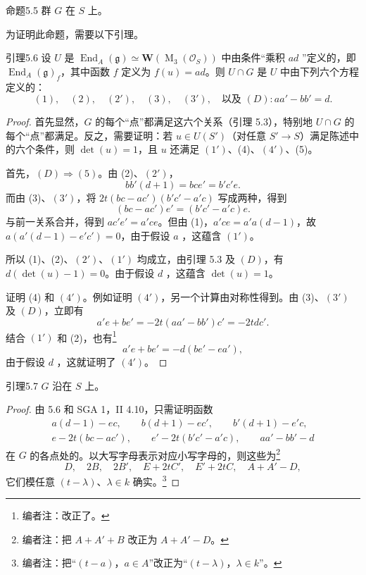 \begin{SGAresult}{命题}{5.5}
群 $G$ 在 $S$ 上。
\end{SGAresult}
为证明此命题，需要以下引理。
\begin{SGAresult}{引理}{5.6}
设 $U$ 是 $\operatorname{End}_A(\mathfrak g)\simeq\mathbf W(\operatorname M_3(\mathscr O_S))$ 中由条件“乘积 $ad$ ”定义的，即 $\operatorname{End}_A(\mathfrak g)_f$，其中函数 $f$ 定义为 $f(u)=ad$。则 $U\cap G$ 是 $U$ 中由下列六个方程定义的：
\[
(1),\quad(2),\quad(2'),\quad(3),\quad(3'),\quad\text{以及 }(D):aa'-bb'=d.
\]
\end{SGAresult}
\begin{proof}
首先显然，$G$ 的每个“点”都满足这六个关系（引理 5.3），特别地 $U\cap G$ 的每个“点”都满足。反之，需要证明：若 $u\in U(S')$（对任意 $S'\to S$）满足陈述中的六个条件，则 $\det(u)=1$，且 $u$ 还满足 $(1')$、(4)、$(4')$、(5)。

首先，$(D)\Rightarrow(5)$。由 (2)、$(2')$，
\[
bb'(d+1)=bce'=b'c'e.
\]
而由 (3)、$(3')$，将 $2t(bc-ac')(b'c'-a'c)$ 写成两种，得到
\[
(bc-ac')e'=(b'c'-a'c)e.
\]
与前一关系合并，得到 $ac'e'=a'ce$。但由 (1)，$a'ce=a'a(d-1)$，故 $a(a'(d-1)-e'c')=0$，由于假设 $a$ ，这蕴含 $(1')$。

所以 (1)、(2)、$(2')$、$(1')$ 均成立，由引理 5.3 及 $(D)$，有 $d(\det(u)-1)=0$。由于假设 $d$ ，这蕴含 $\det(u)=1$。

证明 (4) 和 $(4')$。例如证明 $(4')$，另一个计算由对称性得到。由 (3)、$(3')$ 及 $(D)$，立即有
\[
a'e+be'=-2t(aa'-bb')c'=-2tdc'.
\]
结合 $(1')$ 和 (2)，也有\footnote[38]{编者注：改正了。}
\[
a'e+be'=-d(be'-ea'),
\]
由于假设 $d$ ，这就证明了 $(4')$。
\end{proof}
\begin{SGAresult}{引理}{5.7}
$G$ 沿在 $S$ 上。
\end{SGAresult}
\begin{proof}
由 5.6 和 SGA 1，II 4.10，只需证明函数
\[
\begin{gathered}
a(d-1)-ec,\qquad b(d+1)-ec',\qquad b'(d+1)-e'c,\\
e-2t(bc-ac'),\qquad e'-2t(b'c'-a'c),\qquad aa'-bb'-d
\end{gathered}
\]
在 $G$ 的各点处的。以大写字母表示对应小写字母的，则这些为\footnote[39]{编者注：把 $A+A'+B$ 改正为 $A+A'-D$。}
\[
D,\quad2B,\quad2B',\quad E+2tC',\quad E'+2tC,\quad A+A'-D,
\]
它们模任意 $(t-\lambda)$、$\lambda\in k$ 确实。\footnote[40]{编者注：把“$(t-a)$，$a\in A$”改正为“$(t-\lambda)$，$\lambda\in k$”。}
\end{proof}
